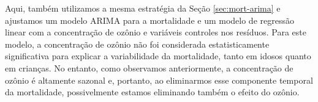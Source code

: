 
Aqui, também utilizamos a mesma estratégia da Seção \ref{sec:mort-arima} e ajustamos um modelo ARIMA para a mortalidade e um modelo de regressão linear com a concentração de ozônio e variáveis controles nos resíduos. Para este modelo, a concentração de ozônio não foi considerada estatisticamente significativa para explicar a variabilidade da mortalidade, tanto em idosos quanto em crianças. No entanto, como observamos anteriormente, a concentração de ozônio é altamente sazonal e, portanto, ao eliminarmos esse componente temporal da mortalidade, possivelmente estamos eliminando também o efeito do ozônio.